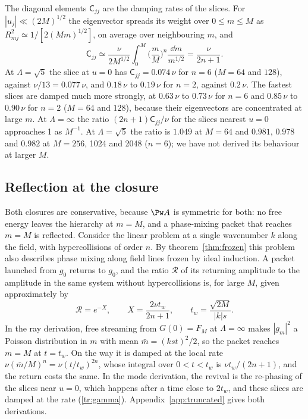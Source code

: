 The diagonal elements $\mathsf C_{jj}$ are the damping rates of the slices. For $|u_j|\ll(2M)^{1/2}$ the eigenvector spreads its weight over $0\le m\le M$ as $R_{mj}^2\simeq1/[2(Mm)^{1/2}]$, on average over neighbouring $m$, and
\begin{equation}\label{tr:gamma}
  \mathsf C_{jj}\simeq\frac{\nu}{2M^{1/2}}\int_0^M\Big(\frac mM\Big)^n\frac{\dd m}{m^{1/2}}=\frac{\nu}{2n+1}.
\end{equation}
At $\Lambda=\sqrt5$ the slice at $u=0$ has $\mathsf C_{jj}=0.074\,\nu$ for $n=6$ ($M=64$ and $128$), against $\nu/13=0.077\,\nu$, and $0.18\,\nu$ to $0.19\,\nu$ for $n=2$, against $0.2\,\nu$. The fastest slices are damped much more strongly, at $0.63\,\nu$ to $0.73\,\nu$ for $n=6$ and $0.85\,\nu$ to $0.90\,\nu$ for $n=2$ ($M=64$ and $128$), because their eigenvectors are concentrated at large $m$. At $\Lambda=\infty$ the ratio $(2n+1)\mathsf C_{jj}/\nu$ for the slices nearest $u=0$ approaches 1 as $M^{-1}$. At $\Lambda=\sqrt5$ the ratio is $1.049$ at $M=64$ and $0.981$, $0.978$ and $0.982$ at $M=256$, 1024 and 2048 ($n=6$); we have not derived its behaviour at larger $M$.

\subsection{Reflection at the closure}\label{tr:reflsec}

Both closures are conservative, because $\Pw A$ is symmetric for both: no free energy leaves the hierarchy at $m=M$, and a phase-mixing packet that reaches $m=M$ is reflected. Consider the linear problem at a single wavenumber $k$ along the field, with hypercollisions of order $n$. By theorem~\ref{thm:frozen} this problem also describes phase mixing along field lines frozen by ideal induction. A packet launched from $g_0$ returns to $g_0$, and the ratio $\mathcal R$ of its returning amplitude to the amplitude in the same system without hypercollisions is, for large $M$, given approximately by
\begin{equation}\label{eq:reflection}
  \mathcal R=e^{-X},\qquad X=\frac{2\nu t_w}{2n+1},\qquad t_w=\frac{\sqrt{2M}}{|k|s} .
\end{equation}
In the ray derivation, free streaming from $G(0)=F_M$ at $\Lambda=\infty$ makes $|g_m|^2$ a Poisson distribution in $m$ with mean $\bar m=(kst)^2/2$, so the packet reaches $m=M$ at $t=t_w$. On the way it is damped at the local rate $\nu(\bar m/M)^n=\nu(t/t_w)^{2n}$, whose integral over $0<t<t_w$ is $\nu t_w/(2n+1)$, and the return costs the same. In the mode derivation, the revival is the re-phasing of the slices near $u=0$, which happens after a time close to $2t_w$, and these slices are damped at the rate (\ref{tr:gamma}). Appendix~\ref{app:truncated} gives both derivations.

